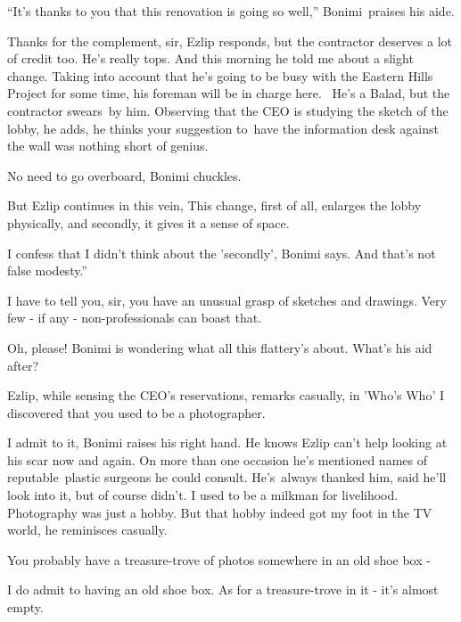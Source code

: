 \documentclass[letterpaper]{article}
\begin{document}
{}``It's thanks to you that this renovation is going so well,'' Bonimi\textcolor{red}{\ }praises his aide.

{\textquotedbl}Thanks for the complement, sir,{\textquotedbl} Ezlip responds, {\textquotedbl}but the contractor deserves
a lot of credit too. He's really tops. And this morning he told me about a slight change. Taking into account that he's
going to be busy with the Eastern Hills Project for some time, his foreman will be in charge here. ~He's a Balad, but
the contractor swears\textcolor{red}{\ }by him.{\textquotedbl} Observing that the CEO is studying the sketch of the
lobby, he adds, {\textquotedbl}he thinks your suggestion to\textcolor{red}{\ }have the information desk against the
wall was nothing short of genius.{\textquotedbl} 

{\textquotedbl}No need to go overboard,{\textquotedbl} Bonimi chuckles. 

But Ezlip continues in this vein, {\textquotedbl}This change, first of all, enlarges the lobby physically, and secondly,
it gives it a sense of space.{\textquotedbl}

{\textquotedbl}I confess that I didn't think about the 'secondly',{\textquotedbl} Bonimi says. {\textquotedbl}And that's
not false modesty.''

{\textquotedbl}I have to tell you, sir, you have an unusual grasp of sketches and drawings. Very few - if any -
non-professionals can boast that.{\textquotedbl} 

{\textquotedbl}Oh, please!{\textquotedbl} Bonimi is wondering what all this flattery's about. What's his aid after? 

Ezlip, while sensing the CEO's reservations, remarks casually, {\textquotedbl}in 'Who's Who' I discovered that you used
to be a photographer.{\textquotedbl}

{\textquotedbl}I admit to it,{\textquotedbl} Bonimi raises his right hand. He knows Ezlip can't help looking at his scar
now and again. On more than one occasion he's mentioned names of reputable\textcolor{red}{\ }plastic surgeons he could
consult. He's\ always thanked him, said he'll look into it, but of course didn't. {\textquotedbl}I used to be a milkman
for livelihood. Photography was just a hobby. But that hobby indeed got my foot in the TV world,{\textquotedbl} he
reminisces casually.\ 

{\textquotedbl}You probably have a treasure-trove of photos somewhere in an old shoe box -{\textquotedbl} 

{\textquotedbl}I do admit to having an old shoe box. As for a treasure-trove in it {}- it's almost
empty.{\textquotedbl}~ 
\end{document}
